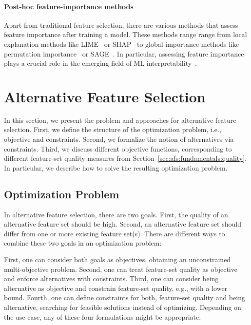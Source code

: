 \documentclass{article}
\theoremstyle{definition}
\begin{document}
\paragraph{Post-hoc feature-importance methods}

Apart from traditional feature selection, there are various methods that assess feature importance after training a model.
These methods range range from local explanation methods like LIME~\cite{ribeiro2016should} or SHAP~\cite{lundberg2017unified} to global importance methods like permutation importance~\cite{breiman2001random} or SAGE~\cite{covert2020understanding}.
In particular, assessing feature importance plays a crucial role in the emerging field of ML interpretability~\cite{carvalho2019machine, molnar2020interpretable}.

\section{Alternative Feature Selection}
\label{sec:afs:approach}

In this section, we present the problem and approaches for alternative feature selection.
First, we define the structure of the optimization problem, i.e., objective and constraints.
Second, we formalize the notion of alternatives via constraints.
Third, we discuss different objective functions, corresponding to different feature-set quality measures from Section~\ref{sec:afs:fundamentals:quality}.
In particular, we describe how to solve the resulting optimization problem.

\subsection{Optimization Problem}
\label{sec:afs:approach:problem}

In alternative feature selection, there are two goals.
First, the quality of an alternative feature set should be high.
Second, an alternative feature set should differ from one or more existing feature set(s).
There are different ways to combine these two goals in an optimization problem:

First, one can consider both goals as objectives, obtaining an unconstrained multi-objective problem.
Second, one can treat feature-set quality as objective and enforce alternatives with constraints.
Third, one can consider being alternative as objective and constrain feature-set quality, e.g., with a lower bound.
Fourth, one can define constraints for both, feature-set quality and being alternative, searching for feasible solutions instead of optimizing.
Depending on the use case, any of these four formulations might be appropriate.
\end{document}
